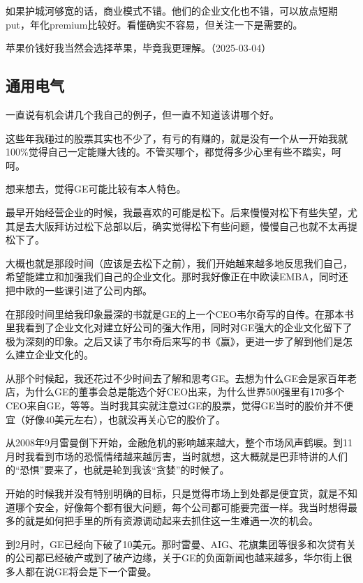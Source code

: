 如果护城河够宽的话，商业模式不错。他们的企业文化也不错，可以放点短期put，年化premium比较好。看懂确实不容易，但关注一下是需要的。


苹果价钱好我当然会选择苹果，毕竟我更理解。（2025-03-04）

\subsection{通用电气}

一直说有机会讲几个我自己的例子，但一直不知道该讲哪个好。

这些年我碰过的股票其实也不少了，有亏的有赚的，就是没有一个从一开始我就100\%觉得自己一定能赚大钱的。不管买哪个，都觉得多少心里有些不踏实，呵呵。

想来想去，觉得GE可能比较有本人特色。

最早开始经营企业的时候，我最喜欢的可能是松下。后来慢慢对松下有些失望，尤其是去大阪拜访过松下总部以后，确实觉得松下有些问题，慢慢自己也就不太再提松下了。

大概也就是那段时间（应该是去松下之前），我们开始越来越多地反思我们自己，希望能建立和加强我们自己的企业文化。那时我好像正在中欧读EMBA，同时还把中欧的一些课引进了公司内部。

在那段时间里给我印象最深的书就是GE的上一个CEO韦尔奇写的自传。在那本书里我看到了企业文化对建立好公司的强大作用，同时对GE强大的企业文化留下了极为深刻的印象。之后又读了韦尔奇后来写的书《赢》，更进一步了解到他们是怎么建立企业文化的。

从那个时候起，我还花过不少时间去了解和思考GE。去想为什么GE会是家百年老店，为什么GE的董事会总是能选个好CEO出来，为什么世界500强里有170多个CEO来自GE，等等。当时我其实就注意过GE的股票，觉得GE当时的股价并不便宜（好像40美元左右），也就没再关心它的股价了。

从2008年9月雷曼倒下开始，金融危机的影响越来越大，整个市场风声鹤唳。到11月时我看到市场的恐慌情绪越来越厉害，当时就想，这大概就是巴菲特讲的人们的“恐惧”要来了，也就是轮到我该“贪婪”的时候了。

开始的时候我并没有特别明确的目标，只是觉得市场上到处都是便宜货，就是不知道哪个安全，好像每个都有很大问题，每个公司都可能要完蛋一样。我当时想得最多的就是如何把手里的所有资源调动起来去抓住这一生难遇一次的机会。

到2月时，GE已经向下破了10美元。那时雷曼、AIG、花旗集团等很多和次贷有关的公司都已经破产或到了破产边缘，关于GE的负面新闻也越来越多，华尔街上很多人都在说GE将会是下一个雷曼。

